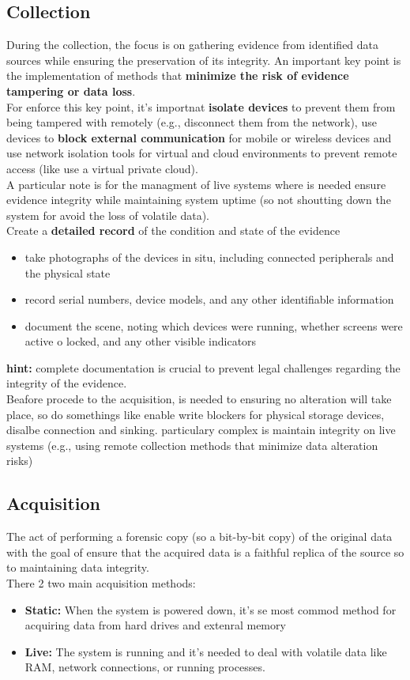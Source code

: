 \subsection{Collection}
During the collection, the focus is on gathering evidence from identified data sources while ensuring the preservation of its integrity. An important key point is the implementation of methods that \textbf{minimize the risk of evidence tampering or data loss}. \\
For enforce this key point, it's importnat \textbf{isolate devices} to prevent them from being tampered with remotely (e.g., disconnect them from the network), use devices to \textbf{block external
communication} for mobile or wireless devices and use network isolation tools for virtual and cloud environments to prevent remote access (like use a virtual private cloud). \\
A particular note is for the managment of live systems where is needed ensure evidence integrity while
maintaining system uptime (so not shoutting down the system for avoid the loss of volatile data). \\
Create a \textbf{detailed record} of the condition and state of the evidence
\begin{itemize}[itemsep=0pt]
  \item take photographs of the devices in situ, including connected peripherals and the physical state
  \item  record serial numbers, device models, and any other identifiable information
  \item  document the scene, noting which devices were running, whether screens were active o locked, and any other visible indicators
\end{itemize}
\textbf{hint:} complete documentation is crucial to prevent legal challenges regarding the integrity of the evidence. \\
Beafore procede to the acquisition, is needed to ensuring no alteration will take place, so do somethings like enable write blockers for physical storage devices, disalbe connection and sinking. particulary complex is maintain  integrity on live systems (e.g., using remote collection methods that minimize data alteration risks)

\subsection{Acquisition}
The act of performing a forensic copy (so a bit-by-bit copy) of the original data with the goal of ensure that the acquired data is a faithful replica of the source so to maintaining data integrity. \\
There 2 two main acquisition methods:
\begin{itemize}
  \item \textbf{Static:} When the system is powered down, it's se most commod method for acquiring data from hard drives and extenral memory
  \item \textbf{Live:} The system is running and it's needed to deal with volatile data like RAM, network connections, or running processes.
\end{itemize}

